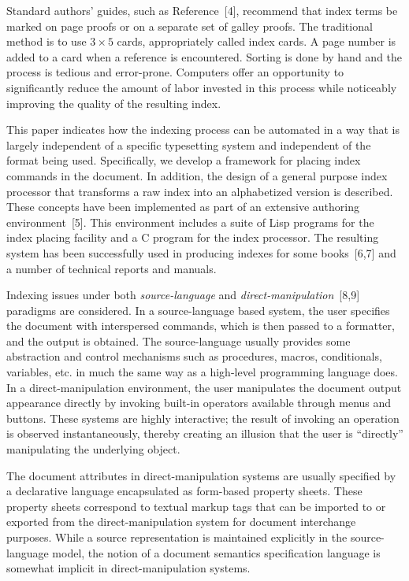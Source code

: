 Standard authors' guides, such as Reference~[4],
recommend that index terms be marked on page proofs or on a separate set of
galley proofs.
The traditional method is to use $3 \times 5$ cards, appropriately called
index cards.
A page number is added to a card when a reference is encountered.
Sorting is done by hand and the process is tedious and error-prone.
Computers offer an opportunity to significantly reduce the amount of labor
invested in this process while noticeably improving the quality of the
resulting index.

This paper indicates how the indexing process can be automated
in a way that is largely independent of a specific typesetting system
and independent of the format being used.
Specifically, we develop a framework for placing index
commands in the document.  In addition, the design of
a general purpose index processor that 
transforms a raw index into an alphabetized version is described.
These concepts have been implemented as part of an extensive authoring
environment~[5].  This environment includes a suite of Lisp programs
for the index placing facility and a C program for the
index processor.  The resulting system has been successfully
used in producing indexes for some books~[6,7]
and a number of technical reports and manuals.

Indexing issues under both {\it source-language\/} and
{\it direct-manipulation\/}~[8,9] paradigms are considered.
In a source-language based system, the user specifies
the document with interspersed commands, which is then passed to a formatter,
and the output is obtained.  The source-language usually provides some
abstraction and control mechanisms such as procedures, macros,
conditionals, variables, etc. in much the same way as a high-level programming
language does.  In a direct-manipulation environment,
the user manipulates the document output appearance directly
by invoking built-in operators available through menus and buttons.
These systems are highly interactive; the result of invoking an operation
is observed instantaneously, thereby creating an illusion that the user
is ``directly'' manipulating the underlying object.

The document attributes in direct-manipulation systems
are usually specified by a declarative language encapsulated as
form-based property sheets.  These property sheets
correspond to textual markup tags that can be imported to
or exported from the direct-manipulation system for document interchange
purposes.  While a source representation is maintained explicitly in the
source-language model, the notion of a document semantics specification
language is somewhat implicit in direct-manipulation systems.

